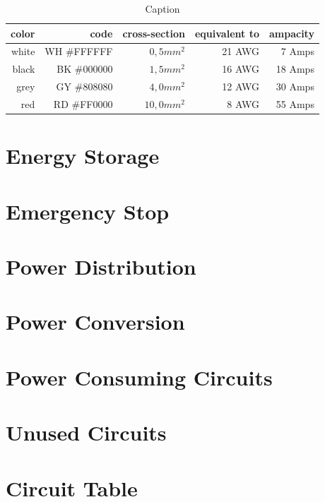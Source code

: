     \begin{table}
        \centering
        \begin{tabular}{|r|r|r|r|r|} \hline 
             color&  code &  cross-section&  equivalent to& ampacity\\ \hline 
             white&  WH \#FFFFFF&  $0,5mm^2$&  21 AWG& 7 Amps\\ \hline 
             black&  BK \#000000&  $1,5mm^2$&  16 AWG& 18 Amps\\ \hline 
             grey&   GY \#808080&  $4,0mm^2$&  12 AWG& 30 Amps\\ \hline 
             red&    RD \#FF0000&  $10,0mm^2$&  8 AWG& 55 Amps\\ \hline
        \end{tabular}
        \caption{Caption}
        \label{color_codes}
    \end{table}
    




\section{Energy Storage}

\section{Emergency Stop}

\section{Power Distribution}

\section{Power Conversion}

\section{Power Consuming Circuits}

\section{Unused Circuits}

\section{Circuit Table}

